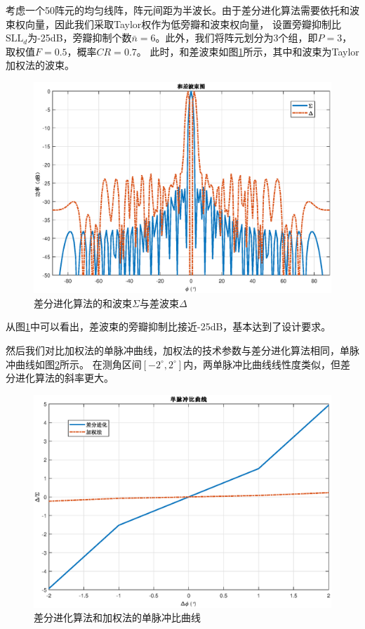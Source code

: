 \documentclass[master]{thesis-uestc}
\begin{document}
考虑一个50阵元的均匀线阵，阵元间距为半波长。由于差分进化算法需要依托和波束权向量，因此我们采取Taylor权作为低旁瓣和波束权向量，
设置旁瓣抑制比$\text{SLL}_d$为-25dB，旁瓣抑制个数$\bar{n}=6$。此外，我们将阵元划分为3个组，即$P=3$，取权值$F=0.5$，概率$CR=0.7$。
此时，和差波束如图\ref{DE_sigma_delta}所示，其中和波束为Taylor加权法的波束。
\begin{figure}[H]
    \includegraphics[scale=0.5]{pic/DE_sigma_delta.eps}
    \caption{差分进化算法的和波束$\Sigma$与差波束$\Delta$}
    \label{DE_sigma_delta}
\end{figure}
从图\ref{DE_sigma_delta}中可以看出，差波束的旁瓣抑制比接近-25dB，基本达到了设计要求。

然后我们对比加权法的单脉冲曲线，加权法的技术参数与差分进化算法相同，单脉冲曲线如图\ref{DE_MRC}所示。
在测角区间$\left[-2^\circ,2^\circ\right]$内，两单脉冲比曲线线性度类似，但差分进化算法的斜率更大。
\begin{figure}[H]
    \includegraphics[scale=0.5]{pic/DE_MRC.eps}
    \caption{差分进化算法和加权法的单脉冲比曲线}
    \label{DE_MRC}
\end{figure}
\end{document}
